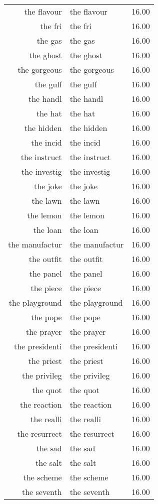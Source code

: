 \begin{table}[ht]
\begin{tabular}{rlr}
  the flavour & the flavour & 16.00 \\ 
  the fri & the fri & 16.00 \\ 
  the gas & the gas & 16.00 \\ 
  the ghost & the ghost & 16.00 \\ 
  the gorgeous & the gorgeous & 16.00 \\ 
  the gulf & the gulf & 16.00 \\ 
  the handl & the handl & 16.00 \\ 
  the hat & the hat & 16.00 \\ 
  the hidden & the hidden & 16.00 \\ 
  the incid & the incid & 16.00 \\ 
  the instruct & the instruct & 16.00 \\ 
  the investig & the investig & 16.00 \\ 
  the joke & the joke & 16.00 \\ 
  the lawn & the lawn & 16.00 \\ 
  the lemon & the lemon & 16.00 \\ 
  the loan & the loan & 16.00 \\ 
  the manufactur & the manufactur & 16.00 \\ 
  the outfit & the outfit & 16.00 \\ 
  the panel & the panel & 16.00 \\ 
  the piece & the piece & 16.00 \\ 
  the playground & the playground & 16.00 \\ 
  the pope & the pope & 16.00 \\ 
  the prayer & the prayer & 16.00 \\ 
  the presidenti & the presidenti & 16.00 \\ 
  the priest & the priest & 16.00 \\ 
  the privileg & the privileg & 16.00 \\ 
  the quot & the quot & 16.00 \\ 
  the reaction & the reaction & 16.00 \\ 
  the realli & the realli & 16.00 \\ 
  the resurrect & the resurrect & 16.00 \\ 
  the sad & the sad & 16.00 \\ 
  the salt & the salt & 16.00 \\ 
  the scheme & the scheme & 16.00 \\ 
  the seventh & the seventh & 16.00 \\ 

\end{tabular}
\end{table}
